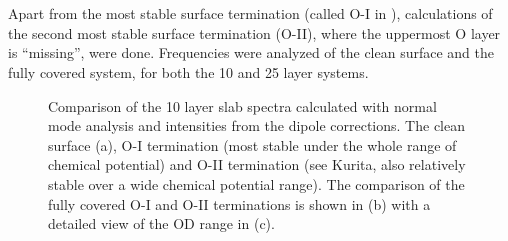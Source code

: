 \documentclass[11pt,DIV=13,BCOR=5mm,a4paper,headinclude]{scrbook}
\begin{document}
\\\\
Apart from the most stable surface termination (called O-I in \cite{kuri10}), calculations of the second most stable surface termination (O-II), where the uppermost O layer is ``missing'', were done.
Frequencies were analyzed of the clean surface and the fully covered system, for both the 10 and 25 layer systems.
\begin{figure}[!h]
 \centering
 \quad
 \quad
 \caption{Comparison of the 10 layer slab spectra calculated with normal mode analysis and intensities from the dipole corrections.
The clean surface (a), O-I termination (most stable under the whole range of chemical potential) and O-II termination (see Kurita\cite{kuri10}, also relatively stable over a wide chemical potential range).
The comparison of the fully covered O-I and O-II terminations is shown in (b) with a detailed view of the OD range in (c).}
 \label{abb:comp_O-I-O-II}
\end{figure}
\end{document}
